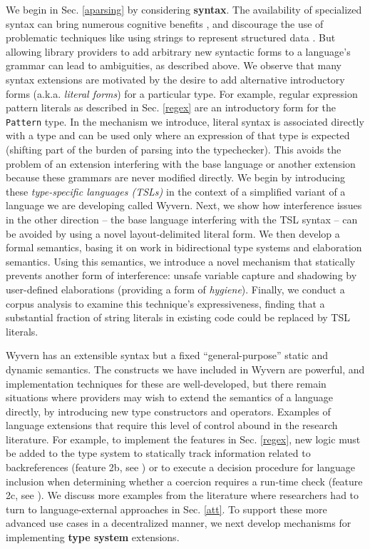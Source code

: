 We begin in Sec. \ref{aparsing} by considering \textbf{syntax}. The availability of specialized syntax can bring numerous cognitive benefits \cite{green1996usability}, and discourage the use of problematic techniques like using strings to represent structured data \cite{Bravenboer:2007:PIA:1289971.1289975}. But allowing library providers to add arbitrary new syntactic forms to a language's grammar can lead to ambiguities, as described above. We observe that many syntax extensions are motivated by the desire to add alternative  introductory forms (a.k.a. \emph{literal forms}) for a particular type. For example, regular expression pattern literals as described in Sec. \ref{regex} are an introductory form for the \verb|Pattern| type.  In the mechanism we introduce, literal syntax is associated directly with a type and can be used only where an expression of that type is expected (shifting part of the burden of parsing into the typechecker). This avoids the problem of an extension interfering with the base language or another extension  because these grammars are never modified directly. We begin by introducing these \emph{type-specific languages (TSLs)} in the context of a simplified variant of a language we are developing called Wyvern. Next, we show how interference issues in the other direction -- the base language interfering with  the TSL syntax -- can be avoided by using a novel layout-delimited literal form. We then develop a formal semantics, basing it on work in bidirectional type systems and elaboration semantics. Using this semantics, we introduce a novel mechanism that statically prevents another form of interference: unsafe variable capture and shadowing by user-defined elaborations (providing a form of \emph{hygiene}). Finally, we conduct a corpus analysis to examine this technique's expressiveness, finding that a substantial fraction of string literals in existing code could be replaced by TSL literals.

Wyvern has an extensible syntax but a fixed ``general-purpose'' static and dynamic semantics. The  constructs we have included in Wyvern are powerful, and implementation techniques for these are well-developed, but there remain situations where providers may wish to extend the {semantics} of a language directly, by introducing new type constructors and operators. Examples of language extensions that require this level of control abound in the research literature. For example, to implement the features in Sec. \ref{regex}, new logic must be added to the type system to statically track information related to backreferences (feature 2b, see \cite{spishak2012type}) or to execute a decision procedure for language inclusion when determining whether a coercion requires a run-time check (feature 2c, see \cite{fulton-thesis}). We discuss more examples from the literature where researchers had to turn to language-external approaches in Sec. \ref{att}. To support these more advanced use cases in a decentralized manner, we next develop mechanisms for implementing \textbf{type system} extensions. 

